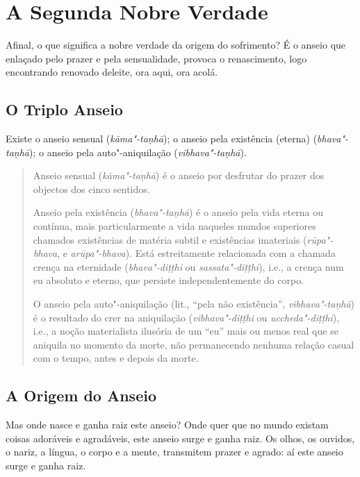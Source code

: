 
\chapter{A Segunda Nobre Verdade}


Afinal, o que significa a nobre verdade da origem do sofrimento? É o anseio que enlaçado pelo prazer e pela sensualidade, provoca o renascimento, logo encontrando renovado deleite, ora aqui, ora acolá.

\section{O Triplo Anseio}

Existe o anseio sensual (\emph{kāma"-taṇhā}); o anseio pela existência (eterna) (\emph{bhava"-taṇhā}); o anseio pela auto"-aniquilação (\emph{vibhava"-taṇhā}).


\begin{quote}
Anseio sensual (\emph{kāma"-ta\d{n}hā}) é o anseio por desfrutar do
prazer dos objectos dos cinco sentidos.

Anseio pela existência (\emph{bhava"-ta\d{n}hā}) é o anseio pela vida eterna ou
contínua, mais particularmente a vida naqueles mundos superiores chamados
existências de matéria subtil e existências imateriais (\emph{rūpa"-bhava}, e
\emph{arūpa"-bhava}). Está estreitamente relacionada com a chamada crença na
eternidade (\emph{bhava"-di\d{t}\d{t}hi} ou \emph{sassata"-di\d{t}\d{t}hi}), i.e.,
a crença num eu absoluto e eterno, que persiste independentemente do corpo.

O anseio pela auto"-aniquilação (lit., ``pela não existência'',
\emph{vibhava"-ta\d{n}hā}) é o resultado do crer na aniquilação
(\emph{vibhava"-di\d{t}\d{t}hi} ou \emph{uccheda"-di\d{t}\d{t}hi}), i.e., a noção
materialista ilusória de um ``eu'' mais ou menos real que se aniquila no momento
da morte, não permanecendo nenhuma relação casual com o tempo, antes e depois da
morte.
\end{quote}

\section{A Origem do Anseio}

Mas onde nasce e ganha raiz este anseio? Onde quer que no mundo existam coisas
adoráveis e agradáveis, este anseio surge e ganha raiz. Os olhos, os ouvidos, o
nariz, a língua, o corpo e a mente, transmitem prazer e agrado: aí este anseio
surge e ganha raiz.

